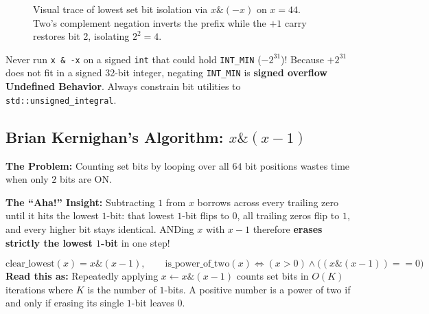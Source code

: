 \documentclass[11pt,a4paper]{article}
\theoremstyle{definition}
\newcommand{\painbeat}{\textbf{\color{accentamber}The Problem:} }
\newcommand{\ahabeat}{\textbf{\color{accentteal}The ``Aha!'' Insight:} }
\begin{document}
\begin{figure}[htbp]
\caption{Visual trace of lowest set bit isolation via $x \mathbin{\&} (-x)$ on $x = 44$. Two's complement negation inverts the prefix while the $+1$ carry restores bit 2, isolating $2^2 = 4$.}
\label{fig:twos_complement_lsb}
\end{figure}

\begin{watchoutbox}
Never run \texttt{x \& -x} on a signed \texttt{int} that could hold \texttt{INT\_MIN} ($-2^{31}$)! Because $+2^{31}$ does not fit in a signed 32-bit integer, negating \texttt{INT\_MIN} is \textbf{signed overflow Undefined Behavior}. Always constrain bit utilities to \texttt{std::unsigned\_integral}.
\end{watchoutbox}

\subsection{Brian Kernighan's Algorithm: \texorpdfstring{$x \mathbin{\&} (x - 1)$}{x \& (x - 1)}}

\painbeat Counting set bits by looping over all $64$ bit positions wastes time when only $2$ bits are ON.

\ahabeat Subtracting $1$ from $x$ borrows across every trailing zero until it hits the lowest $1$-bit: that lowest $1$-bit flips to $0$, all trailing zeros flip to $1$, and every higher bit stays identical. ANDing $x$ with $x - 1$ therefore \textbf{erases strictly the lowest $1$-bit} in one step!

\begin{formulabox}
$$\text{clear\_lowest}(x) = x \mathbin{\&} (x - 1), \qquad \text{is\_power\_of\_two}(x) \iff (x > 0) \land \big((x \mathbin{\&} (x - 1)) == 0\big)$$
\textbf{Read this as:} Repeatedly applying $x \leftarrow x \mathbin{\&} (x - 1)$ counts set bits in $O(K)$ iterations where $K$ is the number of $1$-bits. A positive number is a power of two if and only if erasing its single $1$-bit leaves $0$.
\end{formulabox}
\end{document}
